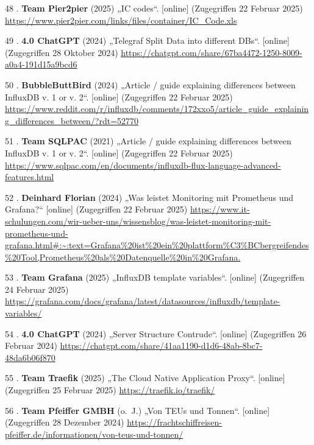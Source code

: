 \documentclass[
    headings=optiontotocandhead,%
    twoside,
    numbers=noenddot,%
    12pt, %
    titlepage, %
    parskip=full, %
    listof=leveldown, 
    numbers=noenddot, %
    a4paper,DIV=14,
    BCOR=15mm,
]{scrbook}
\newlength{\cslhangindent}
\newenvironment{cslreferences}%
  {\setlength{\parindent}{0pt}%
  \everypar{\setlength{\hangindent}{\cslhangindent}}\ignorespaces}%
  {\par}
\begin{document}
\begin{cslreferences}
\leavevmode\hypertarget{ref-ic-codes}{}%
48 . \textbf{Team Pier2pier} (2025) „IC codes``. {[}online{]}
(Zugegriffen 22 Februar 2025)
\url{https://www.pier2pier.com/links/files/container/IC_Code.xls}

\leavevmode\hypertarget{ref-gpt-telegraf-regex}{}%
49 . \textbf{4.0 ChatGPT} (2024) „Telegraf Split Data into different
DBs``. {[}online{]} (Zugegriffen 28 Oktober 2024)
\url{https://chatgpt.com/share/67ba4472-1250-8009-a0a4-191d15a9bcd6}

\leavevmode\hypertarget{ref-influx-v1-vs-v2}{}%
50 . \textbf{BubbleButtBird} (2024) „Article / guide explaining
differences between InfluxDB v. 1 or v. 2``. {[}online{]} (Zugegriffen
22 Februar 2025)
\url{https://www.reddit.com/r/influxdb/comments/172xxo5/article_guide_explaining_differences_between/?rdt=52770}

\leavevmode\hypertarget{ref-flux}{}%
51 . \textbf{Team SQLPAC} (2021) „Article / guide explaining differences
between InfluxDB v. 1 or v. 2``. {[}online{]} (Zugegriffen 22 Februar
2025)
\url{https://www.sqlpac.com/en/documents/influxdb-flux-language-advanced-features.html}

\leavevmode\hypertarget{ref-grafana-general}{}%
52 . \textbf{Deinhard Florian} (2024) „Was leistet Monitoring mit
Prometheus und Grafana?{}`` {[}online{]} (Zugegriffen 22 Februar 2025)
\url{https://www.it-schulungen.com/wir-ueber-uns/wissensblog/was-leistet-monitoring-mit-prometheus-und-grafana.html\#:~:text=Grafana\%20ist\%20ein\%20plattform\%C3\%BCbergreifendes\%20Tool,Prometheus\%20als\%20Datenquelle\%20in\%20Grafana.}

\leavevmode\hypertarget{ref-grafana-variables}{}%
53 . \textbf{Team Grafana} (2025) „InfluxDB template variables``.
{[}online{]} (Zugegriffen 24 Februar 2025)
\url{https://grafana.com/docs/grafana/latest/datasources/influxdb/template-variables/}

\leavevmode\hypertarget{ref-gpt-server-structure}{}%
54 . \textbf{4.0 ChatGPT} (2024) „Server Structure Contrude``.
{[}online{]} (Zugegriffen 26 Februar 2024)
\url{https://chatgpt.com/share/41aa1190-d1d6-48ab-8bc7-48da6b06f870}

\leavevmode\hypertarget{ref-traefik-overview}{}%
55 . \textbf{Team Traefik} (2025) „The Cloud Native Application Proxy``.
{[}online{]} (Zugegriffen 25 Februar 2025)
\url{https://traefik.io/traefik/}

\leavevmode\hypertarget{ref-Pfeiffer-Containerschiffe}{}%
56 . \textbf{Team Pfeiffer GMBH} (o.~J.) „Von TEUs und Tonnen``.
{[}online{]} (Zugegriffen 28 Dezember 2024)
\url{https://frachtschiffreisen-pfeiffer.de/informationen/von-teus-und-tonnen/}


\end{cslreferences}
\end{document}
